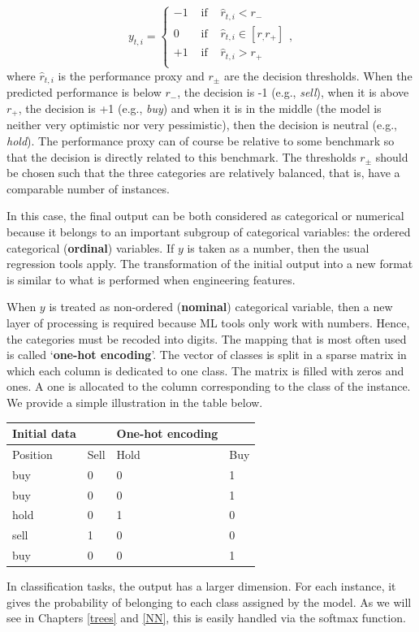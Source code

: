\documentclass[]{krantz}
\theoremstyle{definition}
\theoremstyle{definition}
\theoremstyle{definition}
\theoremstyle{remark}
\begin{document}
\[y_{t,i}=\left\{  \begin{array}{rll}
-1 & \text{ if } & \hat{r}_{t,i} < r_- \\
0 & \text{ if } & \hat{r}_{t,i} \in [r_,r_+] \\
+1 & \text{ if } & \hat{r}_{t,i} > r_+ \\
\end{array} \right.,\] where \(\hat{r}_{t,i}\) is the performance proxy
and \(r_\pm\) are the decision thresholds. When the predicted
performance is below \(r_-\), the decision is -1 (e.g., \emph{sell}),
when it is above \(r_+\), the decision is +1 (e.g., \emph{buy}) and when
it is in the middle (the model is neither very optimistic nor very
pessimistic), then the decision is neutral (e.g., \emph{hold}). The
performance proxy can of course be relative to some benchmark so that
the decision is directly related to this benchmark. The thresholds
\(r_\pm\) should be chosen such that the three categories are relatively
balanced, that is, have a comparable number of instances.

In this case, the final output can be both considered as categorical or
numerical because it belongs to an important subgroup of categorical
variables: the ordered categorical (\textbf{ordinal}) variables. If
\(y\) is taken as a number, then the usual regression tools apply. The
transformation of the initial output into a new format is similar to
what is performed when engineering features.

When \(y\) is treated as non-ordered (\textbf{nominal}) categorical
variable, then a new layer of processing is required because ML tools
only work with numbers. Hence, the categories must be recoded into
digits. The mapping that is most often used is called `\textbf{one-hot
encoding}'. The vector of classes is split in a sparse matrix in which
each column is dedicated to one class. The matrix is filled with zeros
and ones. A one is allocated to the column corresponding to the class of
the instance. We provide a simple illustration in the table below.

\begin{longtable}[]{@{}llll@{}}
\toprule
Initial data & & One-hot encoding &\tabularnewline
\midrule
\endhead
Position & Sell & Hold & Buy\tabularnewline
buy & 0 & 0 & 1\tabularnewline
buy & 0 & 0 & 1\tabularnewline
hold & 0 & 1 & 0\tabularnewline
sell & 1 & 0 & 0\tabularnewline
buy & 0 & 0 & 1\tabularnewline
\bottomrule
\end{longtable}

In classification tasks, the output has a larger dimension. For each
instance, it gives the probability of belonging to each class assigned
by the model. As we will see in Chapters \ref{trees} and \ref{NN}, this
is easily handled via the softmax function.
\end{document}
